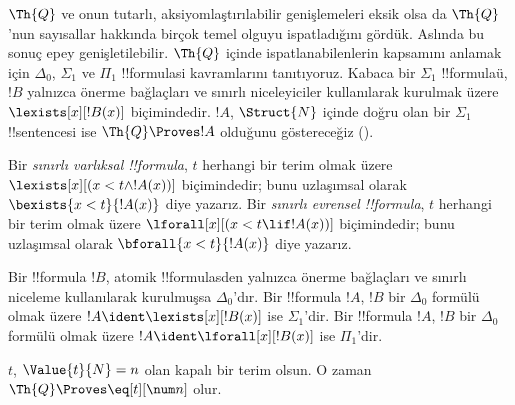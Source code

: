


$\Th{Q}$ ve onun tutarlı, aksiyomlaştırılabilir genişlemeleri eksik olsa da
$\Th{Q}$'nun sayısallar hakkında birçok temel olguyu ispatladığını gördük.
Aslında bu sonuç epey genişletilebilir. $\Th{Q}$ içinde ispatlanabilenlerin
kapsamını anlamak için $\Delta_0$, $\Sigma_1$ ve $\Pi_1$ !!{formula}s{}i
kavramlarını tanıtıyoruz. Kabaca bir $\Sigma_1$ !!{formula}{}ü, $!B$ yalnızca
önerme bağlaçları ve sınırlı niceleyiciler kullanılarak kurulmak üzere
$\lexists[x][!B(x)]$ biçimindedir. $!A$, $\Struct{N}$ içinde doğru olan bir
$\Sigma_1$ !!{sentence}{}si ise $\Th{Q} \Proves !A$ olduğunu göstereceğiz
().

\begin{defn}
Bir \emph{sınırlı varlıksal !!{formula}}, $t$ herhangi bir terim olmak üzere
$\lexists[x][(x<t\land !A(x))]$ biçimindedir; bunu uzlaşımsal olarak
$\bexists{x<t}{!A(x)}$ diye yazarız.
%
Bir \emph{sınırlı evrensel !!{formula}}, $t$ herhangi bir terim olmak üzere
$\lforall[x][(x<t\lif !A(x))]$ biçimindedir; bunu uzlaşımsal olarak
$\bforall{x<t}{!A(x)}$ diye yazarız.
\end{defn}

\begin{defn}
Bir !!{formula} $!B$, atomik !!{formula}s{}den yalnızca önerme bağlaçları ve
sınırlı niceleme kullanılarak kurulmuşsa $\Delta_0$'dır.
%
Bir !!{formula} $!A$, $!B$ bir $\Delta_0$ formülü olmak üzere
$!A\ident\lexists[x][!B(x)]$ ise $\Sigma_1$'dir.
%
Bir !!{formula} $!A$, $!B$ bir $\Delta_0$ formülü olmak üzere
$!A\ident\lforall[x][!B(x)]$ ise $\Pi_1$'dir.
\end{defn}

\begin{lem}
 $t$, $\Value{t}{N}=n$ olan kapalı bir terim
olsun. O zaman $\Th{Q} \Proves \eq[t][\num n]$ olur.
\end{lem}

